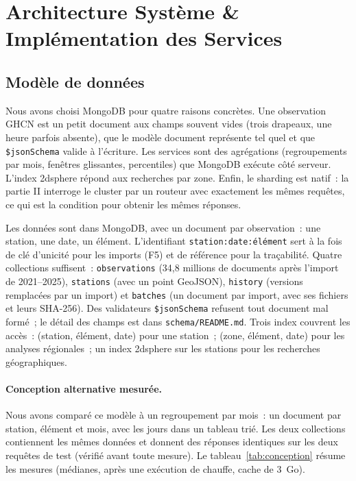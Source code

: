 \section{Architecture Système \& Implémentation des Services}
\label{sec:architecture}

\subsection{Modèle de données}
Nous avons choisi MongoDB pour quatre raisons concrètes. Une observation GHCN est un petit document aux champs souvent vides (trois drapeaux, une heure parfois absente), que le modèle document représente tel quel et que \texttt{\$jsonSchema} valide à l'écriture. Les services sont des agrégations (regroupements par mois, fenêtres glissantes, percentiles) que MongoDB exécute côté serveur. L'index 2dsphere répond aux recherches par zone. Enfin, le sharding est natif~: la partie II interroge le cluster par un routeur avec exactement les mêmes requêtes, ce qui est la condition pour obtenir les mêmes réponses.

Les données sont dans MongoDB, avec un document par observation~: une station, une date, un élément. L'identifiant \texttt{station:date:élément} sert à la fois de clé d'unicité pour les imports (F5) et de référence pour la traçabilité. Quatre collections suffisent~: \texttt{observations} (34,8 millions de documents après l'import de 2021--2025), \texttt{stations} (avec un point GeoJSON), \texttt{history} (versions remplacées par un import) et \texttt{batches} (un document par import, avec ses fichiers et leurs SHA-256). Des validateurs \texttt{\$jsonSchema} refusent tout document mal formé~; le détail des champs est dans \texttt{schema/README.md}. Trois index couvrent les accès~: (station, élément, date) pour une station~; (zone, élément, date) pour les analyses régionales~; un index 2dsphere sur les stations pour les recherches géographiques.

\paragraph{Conception alternative mesurée.} Nous avons comparé ce modèle à un regroupement par mois~: un document par station, élément et mois, avec les jours dans un tableau trié. Les deux collections contiennent les mêmes données et donnent des réponses identiques sur les deux requêtes de test (vérifié avant toute mesure). Le tableau~\ref{tab:conception} résume les mesures (médianes, après une exécution de chauffe, cache de 3~Go).

